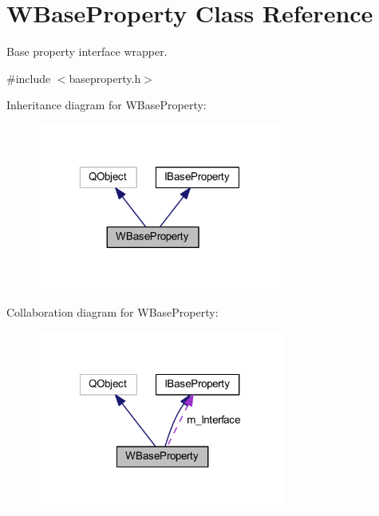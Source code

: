 \hypertarget{class_w_base_property}{\section{W\-Base\-Property Class Reference}
\label{class_w_base_property}
}


Base property interface wrapper.  




{\ttfamily \#include $<$baseproperty.\-h$>$}



Inheritance diagram for W\-Base\-Property\-:
\nopagebreak
\begin{figure}[H]
\begin{center}
\leavevmode
\includegraphics[width=229pt]{class_w_base_property__inherit__graph}
\end{center}
\end{figure}


Collaboration diagram for W\-Base\-Property\-:
\nopagebreak
\begin{figure}[H]
\begin{center}
\leavevmode
\includegraphics[width=231pt]{class_w_base_property__coll__graph}
\end{center}
\end{figure}

